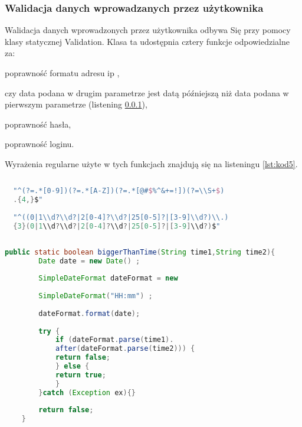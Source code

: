 	
	\subsubsection{Walidacja danych wprowadzanych przez użytkownika}
	Walidacja danych wprowadzonych przez użytkownika odbywa Się przy pomocy klasy statycznej Validation. Klasa ta udostępnia cztery funkcje odpowiedzialne za:
	\begin{itemize*}
	\item poprawność formatu adresu ip ,
	\item czy data podana w drugim parametrze jest datą późniejszą niż data podana w pierwszym parametrze (listening \ref{}),
	\item poprawność hasła,
	\item poprawność loginu.
	
	\end{itemize*}
	Wyrażenia regularne użyte w tych funkcjach znajdują się na listeningu \ref{lst:kod5}.
	
	\begin{lstlisting}[caption={Wyrażenia regularne.}, label={lst:kod4}, language=Kotlin]
 
  "^(?=.*[0-9])(?=.*[A-Z])(?=.*[@#$%^&+=!])(?=\\S+$)
  .{4,}$"
 
  "^((0|1\\d?\\d?|2[0-4]?\\d?|25[0-5]?|[3-9]\\d?)\\.)
  {3}(0|1\\d?\\d?|2[0-4]?\\d?|25[0-5]?|[3-9]\\d?)$"
 
		\end{lstlisting}
		
		
			\begin{lstlisting}[caption={Funkcja odpowiedzialna za sprawdzanie która data jest pó"zniejsza.}, label={lst:kod5}, language=Java]
	public static boolean biggerThanTime(String time1,String time2){
		Date date = new Date() ;
		
		SimpleDateFormat dateFormat = new 
		
		SimpleDateFormat("HH:mm") ;
		
		dateFormat.format(date);
		
		try {
			if (dateFormat.parse(time1).
			after(dateFormat.parse(time2))) {
			return false;
			} else {
			return true;
			}
		}catch (Exception ex){}
		
		return false;
	}
	
		\end{lstlisting}
